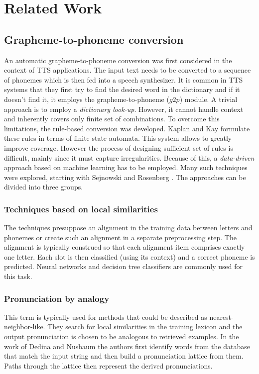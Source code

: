 \section{Related Work}
\label{relatedwork}
\subsection{Grapheme-to-phoneme conversion}
An automatic grapheme-to-phoneme conversion was first considered in the context of TTS applications. The input text needs to be converted to a sequence of phonemes which is then fed into a speech synthesizer.
It is common in TTS systems that they first try to find the desired word in the dictionary and if it doesn't find it, it employs the grapheme-to-phoneme ($g2p$) module.
A trivial approach is to employ a \textit{dictionary look-up}.
However, it cannot handle context and inherently covers only finite set of combinations.
To overcome this limitations, the rule-based conversion was developed.
Kaplan and Kay \cite{kaplan1994regular} formulate these rules in terms of finite-state automata.
This system allows to greatly improve coverage.
However the process of designing sufficient set of rules is difficult, mainly since it must capture irregularities.
Because of this, a \textit{data-driven} approach based on machine learning has to be employed.
Many such techniques were explored, starting with Sejnowski and Rosenberg \cite{sejnowski1988nettalk}.
The approaches can be divided into three groups.
\subsubsection{Techniques based on local similarities}
The techniques presuppose an alignment in the training data between letters and phonemes or create such an alignment in a separate preprocessing step.
The alignment is typically construed so that each alignment item comprises exactly one letter.
Each slot is then classified (using its context) and a correct phoneme is predicted.
Neural networks and decision tree classifiers are commonly used for this task.
\subsubsection{Pronunciation by analogy}
This term is typically used for methods that could be described as nearest-neighbor-like.
They search for local similarities in the training lexicon and the output pronunciation is chosen to be analogous to retrieved examples. 
In the work of Dedina and Nusbaum \cite{dedina1991pronounce} the authors first identify words from the database that match the input string and then build a pronunciation lattice from them.
Paths through the lattice then represent the derived pronunciations.
